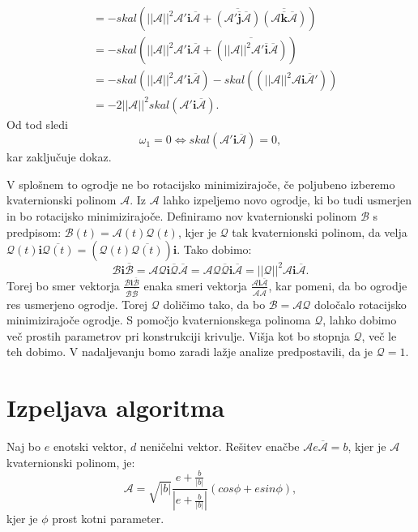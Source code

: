 \documentclass[mat1]{fmfdelo}
\newcommand{\ii}{\boldsymbol i}
\newcommand{\jj}{\boldsymbol j}
\newcommand{\kk}{\boldsymbol k}
\newcommand{\A}{\mathcal A}
\newcommand{\B}{\mathcal B}
\newcommand{\QQ}{\mathcal Q}
\begin{document}
\begin{dokaz}
\begin{equation*}
\begin{split}
	&= -skal \left( ||\A||^2 \A' \ii \overline{\A}+ \overline{\left(\A' \overline{\jj} \overline{\A}\right)} \overline{ \left( \A \overline{\kk} \overline{\A} \right) }\right) \\
	&= -skal \left( ||\A||^2 \A' \ii \overline{\A}+ \overline{\left( ||\A||^2 \A' \overline{\ii} \overline{\A}\right)} \right) \\
	&= -skal \left( ||\A||^2 \A' \ii \overline{\A} \right)-skal \left(\left( ||\A||^2 \A \ii \overline{\A}'\right) \right) \\
	&= -2||\A||^2 skal \left( \A' \ii \overline{\A}\right).
\end{split}
\end{equation*}
Od tod sledi
\begin{equation*}
\omega_1 = 0 \Leftrightarrow skal \left( \A' \ii \overline{\A} \right) = 0,
\end{equation*}
kar zaključuje dokaz.
\end{dokaz}
\begin{opomba}
V splošnem to ogrodje ne bo rotacijsko minimizirajoče, če poljubeno izberemo kvaternionski polinom $\A$. Iz $\A$ lahko izpeljemo novo ogrodje, ki bo tudi usmerjen in bo rotacijsko minimizirajoče. Definiramo nov kvaternionski polinom $\B$ s predpisom: $\B(t) = \A(t) \QQ(t)$, kjer je $\QQ$ tak kvaternionski polinom, da velja $\QQ(t) \ii \overline{\QQ(t)} = \left( \QQ(t) \overline{\QQ(t)} \right) \ii$. Tako dobimo:
\begin{equation*}
	\B \ii \overline{\B} = \A \QQ \ii \overline{\QQ} \overline{\A} = \A \QQ \overline{\QQ} \ii \overline{\A} = ||\QQ||^2\A\ii\overline{\A}.
\end{equation*}
Torej bo smer vektorja $\frac{\B \ii \overline{\B}}{\B  \overline{\B}}$ enaka smeri vektorja $\frac{\A \ii \overline{\A}}{\A  \overline{\A}}$, kar pomeni, da bo ogrodje res usmerjeno ogrodje. Torej $\QQ$ doličimo tako, da bo $\B = \A\QQ$ določalo rotacijsko minimizirajoče ogrodje. S pomočjo kvaternionskega polinoma $\QQ$, lahko dobimo več prostih parametrov pri konstrukciji krivulje. Višja kot bo stopnja $\QQ$, več le teh dobimo. V nadaljevanju bomo zaradi lažje analize predpostavili, da je $\QQ=1$.
\end{opomba}


\section{Izpeljava algoritma}
\iffalse

\begin{izrek}
Naj bo $e$ enotski vektor, $d$ neničelni vektor. Rešitev enačbe $\A e \overline{\A} = b$, kjer je $\A$ kvaternionski polinom, je:
\begin{equation*}
	\A = \sqrt{|b|} \frac{e+\frac{b}{|b|}}{|e+\frac{b}{|b|}|} \left( cos \phi + e sin\phi \right),
\end{equation*}
kjer je $\phi$ prost kotni parameter.
\end{izrek}
\end{document}
